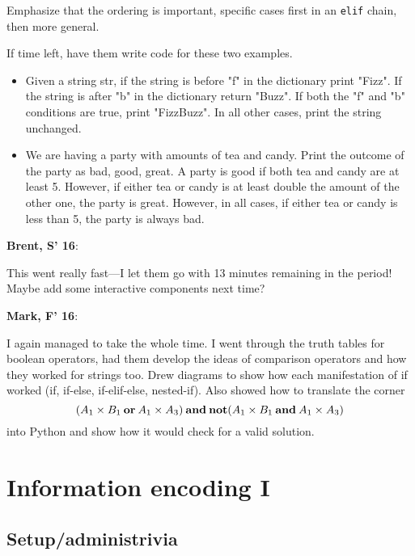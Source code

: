 \documentclass{article}
\newenvironment{reflect}[1]
{
  \noindent
  \begin{lrbox}{\reflectbox}
    \begin{minipage}[t]{\textwidth}
      \textbf{#1}:
}{
    \end{minipage}
  \end{lrbox}
  \fbox{\usebox{\reflectbox}}
}
\begin{document}
Emphasize that the ordering is important, specific cases first in an {\tt elif} chain, then more general.

If time left, have them write code for these two examples.

\begin{itemize}
\item Given a string str, if the string is before "f" in the dictionary print "Fizz". If the string is after "b" in the dictionary return "Buzz". If both the "f" and "b" conditions are true, print "FizzBuzz". In all other cases, print the string unchanged.

\item We are having a party with amounts of tea and candy. Print the outcome of the party as bad, good, great. A party is good if both tea and candy are at least 5. However, if either tea or candy is at least double the amount of the other one, the party is great. However, in all cases, if either tea or candy is less than 5, the party is always bad.

\end{itemize}

\begin{reflect}{Brent, S' 16}
  This went really fast---I let them go with 13 minutes remaining in
  the period!  Maybe add some interactive components next time?
\end{reflect}

\begin{reflect}{Mark, F' 16}
  I again managed to take the whole time. I went through the truth 
  tables for boolean operators, had them develop the ideas of comparison
  operators and how they worked for strings too. Drew diagrams to show
  how each manifestation of if worked (if, if-else, if-elif-else, nested-if). Also
  showed how to translate the corner \[ (A_1 \times B_1 \mathbin{\mathbf{or}} A_1 \times A_3) \mathbin{\mathbf{and}} \mathbin{\mathbf{not}} (A_1 \times B_1 \mathbin{\mathbf{and}} A_1
\times A_3) \] into Python and show how it would check for a valid solution.
\end{reflect}


\newpage

\section{Information encoding I}

\subsection*{Setup/administrivia}
\end{document}
